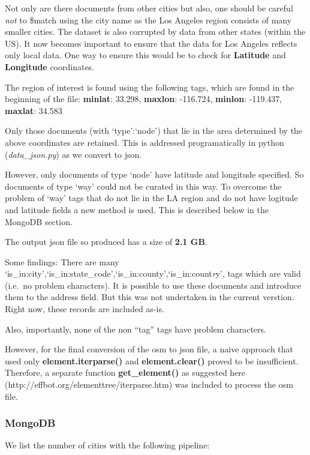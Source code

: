 \documentclass[]{article}
\begin{document}
Not only are there documents from other cities but also, one should be
careful \emph{not} to \$match using the city name as the Los Angeles
region consists of many smaller cities. The dataset is also corrupted by
data from other states (within the US). It now becomes important to
ensure that the data for Los Angeles reflects only local data. One way
to ensure this would be to check for \textbf{Latitude} and
\textbf{Longitude} coordinates.

The region of interest is found using the following tags, which are
found in the beginning of the file: \textbf{minlat}: 33.298,
\textbf{maxlon}: -116.724, \textbf{minlon}: -119.437, \textbf{maxlat}:
34.583

Only those documents (with `type':`node') that lie in the area
determined by the above coordinates are retained. This is addressed
programatically in python (\emph{data\_json.py}) as we convert to json.

However, only documents of type `node' have latitude and longitude
specified. So documents of type `way' could not be curated in this way.
To overcome the problem of `way' tags that do not lie in the LA region
and do not have logitude and latitude fields a new method is used. This
is described below in the MongoDB section.

The output json file so produced has a size of \textbf{2.1 GB}.

Some findings: There are many
`is\_in:city',`is\_in:state\_code',`is\_in:county',`is\_in:count\emph{r}y',
tags which are valid (i.e.~no problem characters). It is possible to use
these documents and introduce them to the address field. But this was
not undertaken in the current verstion. Right now, these records are
included as-is.

Also, importantly, none of the non ``tag'' tags have problem characters.

However, for the final conversion of the osm to json file, a naive
approach that used only \textbf{element.iterparse()} and
\textbf{element.clear()} proved to be insufficient. Therefore, a
separate function \textbf{get\_element()} as suggested here
(http://effbot.org/elementtree/iterparse.htm) was included to process
the osm file.

\subsubsection{MongoDB}\label{mongodb}

We list the number of cities with the following pipeline:
\end{document}

